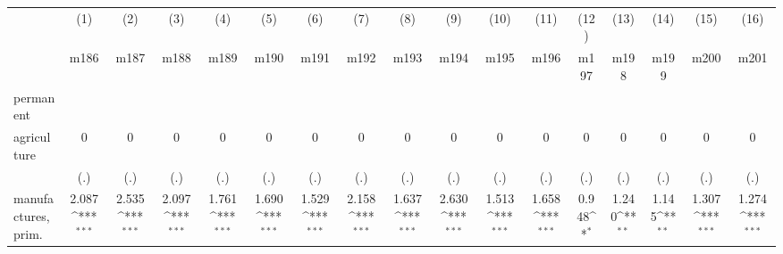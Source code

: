 {
\def\sym#1{\ifmmode^{#1}\else\(^{#1}\)\fi}
\begin{tabular}{l*{16}{c}}
\hline\hline
                    &\multicolumn{1}{c}{(1)}&\multicolumn{1}{c}{(2)}&\multicolumn{1}{c}{(3)}&\multicolumn{1}{c}{(4)}&\multicolumn{1}{c}{(5)}&\multicolumn{1}{c}{(6)}&\multicolumn{1}{c}{(7)}&\multicolumn{1}{c}{(8)}&\multicolumn{1}{c}{(9)}&\multicolumn{1}{c}{(10)}&\multicolumn{1}{c}{(11)}&\multicolumn{1}{c}{(12)}&\multicolumn{1}{c}{(13)}&\multicolumn{1}{c}{(14)}&\multicolumn{1}{c}{(15)}&\multicolumn{1}{c}{(16)}\\
                    &\multicolumn{1}{c}{m186}&\multicolumn{1}{c}{m187}&\multicolumn{1}{c}{m188}&\multicolumn{1}{c}{m189}&\multicolumn{1}{c}{m190}&\multicolumn{1}{c}{m191}&\multicolumn{1}{c}{m192}&\multicolumn{1}{c}{m193}&\multicolumn{1}{c}{m194}&\multicolumn{1}{c}{m195}&\multicolumn{1}{c}{m196}&\multicolumn{1}{c}{m197}&\multicolumn{1}{c}{m198}&\multicolumn{1}{c}{m199}&\multicolumn{1}{c}{m200}&\multicolumn{1}{c}{m201}\\
\hline
permanent           &                     &                     &                     &                     &                     &                     &                     &                     &                     &                     &                     &                     &                     &                     &                     &                     \\
agriculture         &           0         &           0         &           0         &           0         &           0         &           0         &           0         &           0         &           0         &           0         &           0         &           0         &           0         &           0         &           0         &           0         \\
                    &         (.)         &         (.)         &         (.)         &         (.)         &         (.)         &         (.)         &         (.)         &         (.)         &         (.)         &         (.)         &         (.)         &         (.)         &         (.)         &         (.)         &         (.)         &         (.)         \\
[1em]
manufactures, prim. &       2.087\sym{***}&       2.535\sym{***}&       2.097\sym{***}&       1.761\sym{***}&       1.690\sym{***}&       1.529\sym{***}&       2.158\sym{***}&       1.637\sym{***}&       2.630\sym{***}&       1.513\sym{***}&       1.658\sym{***}&       0.948\sym{*}  &       1.240\sym{**} &       1.145\sym{**} &       1.307\sym{***}&       1.274\sym{***}\\

\end{tabular}}
